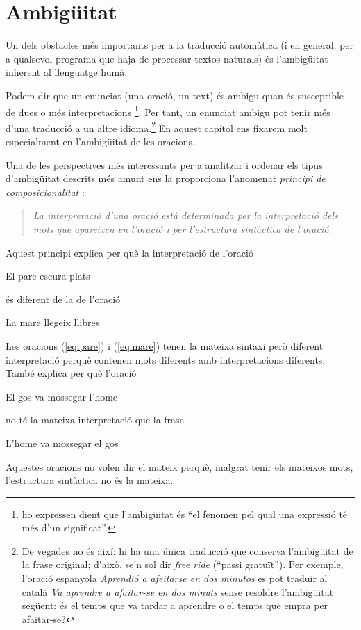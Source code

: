 \chapter{Ambigüitat}
\label{se:ambig}




Un dels obstacles més importants per a la traducció automàtica (i en
general, per a qualsevol programa que haja de processar textos
naturals) és l'am\-bi\-güi\-tat inherent al llenguatge humà. 

Podem dir que un enunciat (una oració, un text) és ambigu quan és
susceptible de dues o més interpretacions
\citep{alcaraz97b}\footnote{\citet{don96u} ho expressen dient que
  l'ambigüitat és ``el fenomen pel qual una expressió té més d'un
  significat''.}. Per tant, un enunciat ambigu pot tenir més d'una
traducció a un altre idioma.\footnote{De vegades no és així: hi ha una
  única traducció que conserva l'ambigüitat de la frase original;
  d'això, se'n sol dir \emph{free ride} (``passi gratuït''). Per
  exemple, l'oració espanyola \emph{Aprendió a afeitarse en dos
    minutos} es pot traduir al català \emph{Va aprendre a afaitar-se
    en dos minuts} sense resoldre l'ambigüitat següent: és el temps
  que va tardar a aprendre o el temps que empra per afaitar-se?} En
aquest capítol ens fixarem molt especialment en l'ambigüitat de les
oracions.

Una de les perspectives més interessants per a analitzar i ordenar els
tipus d'ambigüitat descrits més amunt ens la proporciona l'anomenat
\emph{principi de composicionalitat}  \citep{radford99b}:
\begin{quote}
{\sl
La interpretació d'una oració està determinada per la interpretació
dels mots que apareixen en l'oració i per l'estructura sin\-tàc\-tica de
l'oració.
}
\end{quote}
Aquest principi explica per què la interpretació de l'oració
\begin{exemple}
\label{eq:pare}
El pare escura plats
\end{exemple}
 és diferent de la de l'oració
\begin{exemple} 
La mare llegeix
  llibres
\label{eq:mare}
\end{exemple}
Les oracions (\ref{eq:pare}) i (\ref{eq:mare}) tenen la mateixa sintaxi però diferent
interpretació perquè contenen mots diferents amb interpretacions
diferents. També explica per què l'oració 
\begin{exemple}
El gos va mossegar
  l'home
\end{exemple}
 no té la mateixa interpretació que la frase 
\begin{exemple}
L'home va
  mossegar el gos
\end{exemple} 
Aquestes oracions no volen dir el mateix perquè, malgrat tenir els
mateixos mots, l'estructura sintàctica no és la mateixa.


